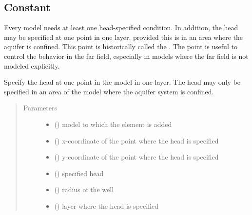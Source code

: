 \documentclass[letterpaper,10pt,english]{sphinxmanual}
\begin{document}
\subsection{Constant}
\label{\detokenize{constant:constant}}\label{\detokenize{constant::doc}}
Every model needs at least one head-specified condition. In addition, the head may be specified at one point in one layer,
provided this is in an area where the aquifer is confined. This point is historically called the .
The  point is useful to control the behavior in the far field, especially in models where the far field is
not modeled explicitly.

\begin{fulllineitems}
\label{\detokenize{constant:timml.constant.Constant}}
Specify the head at one point in the model in one layer.
The head may only be specified in an area of the model where
the aquifer system is confined.
\begin{quote}\begin{description}
\item[{Parameters}] \leavevmode\begin{itemize}
\item {} 
 () \textendash{} model to which the element is added

\item {} 
 () \textendash{} x-coordinate of the point where the head is specified

\item {} 
 () \textendash{} y-coordinate of the point where the head is specified

\item {} 
 () \textendash{} specified head

\item {} 
 () \textendash{} radius of the well

\item {} 
 () \textendash{} layer where the head is specified


\end{itemize}
\end{description}
\end{quote}
\end{fulllineitems}
\end{document}
